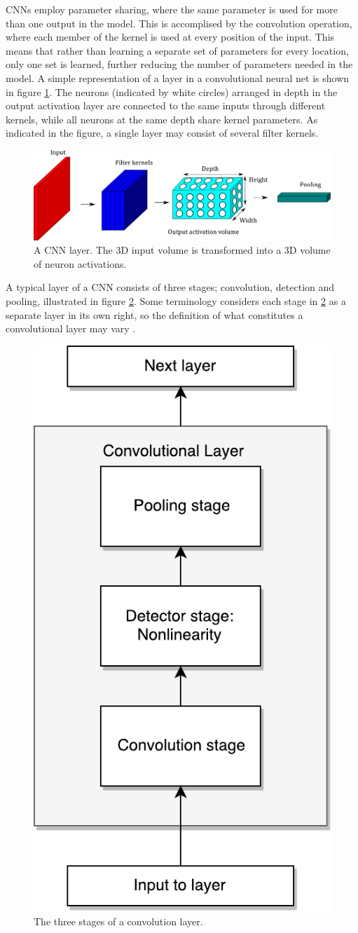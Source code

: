 CNNs employ parameter sharing, where the same parameter is used for more than one output in the model. This is accomplised by the convolution operation, where each member of the kernel is used at every position of the input. This means that rather than learning a separate set of parameters for every location, only one set is learned, further reducing the number of parameters needed in the model. A simple representation of a layer in a convolutional neural net is shown in figure \ref{fig:conv}. The neurons (indicated by white circles) arranged in depth in the output activation layer are connected to the same inputs through different kernels, while all neurons at the same depth share kernel parameters. As indicated in the figure, a single layer may consist of several filter kernels.
\begin{figure}[H]
	\centering
	\includegraphics[width=.7\linewidth]{fig/conv_simple.png}
	\caption{A CNN layer. The 3D input volume is transformed into a 3D volume of neuron activations.}
    \label{fig:conv}
\end{figure}
A typical layer of a CNN consists of three stages; convolution, detection and pooling, illustrated in figure \ref{fig:conv_layer}. Some terminology considers each stage in \ref{fig:conv_layer} as a separate layer in its own right, so the definition of what constitutes a convolutional layer may vary \cite{Goodfellow-et-al-2016}.
\begin{figure}[H]
	\centering
	\includegraphics[width=.4\linewidth]{fig/conv.pdf}
	\caption{The three stages of a convolution layer.}
	\label{fig:conv_layer}
\end{figure}
